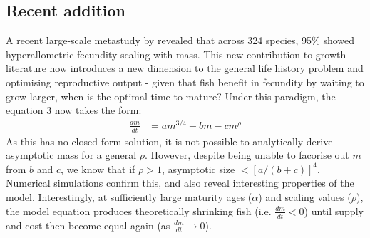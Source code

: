 \documentclass[a3paper]{article} %
\begin{document}
\begin{multicols}{2}
\section{Recent addition}
A recent large-scale metastudy by \cite{Barneche2018d} revealed that across 324 species, 95\% showed hyperallometric fecundity scaling with mass. This new contribution to growth literature now introduces a new dimension to the general life history problem and optimising reproductive output - given that fish benefit in fecundity by waiting to grow larger, when is the optimal time to mature? Under this paradigm, the equation 3 now takes the form:
\begin{align}
    \frac{dm}{dt} &= am^{3/4} - bm - cm^{\rho}
\end{align}
As this has no closed-form solution, it is not possible to analytically derive asymptotic mass for a general $\rho$. However, despite being unable to facorise out $m$ from $b$ and $c$, we know that if $\rho > 1$, asymptotic size $< [a/(b+c)]^4$. Numerical simulations confirm this, and also reveal interesting properties of the model. Interestingly, at sufficiently large maturity ages ($\alpha$) and scaling values ($\rho$), the model equation produces theoretically shrinking fish (i.e. $\frac{dm}{dt} < 0$) until supply and cost then become equal again (as $\frac{dm}{dt} \rightarrow 0$). 


\end{multicols}
\end{document}
